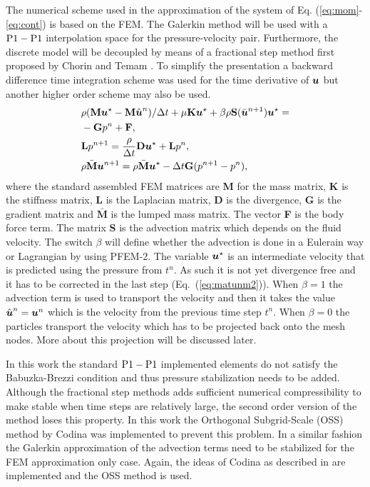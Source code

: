 The numerical scheme used in the approximation of the system of Eq. (\ref{eq:mom}-\ref{eq:cont}) is based on the FEM. The Galerkin method will be used with a $\rm{P1}-\rm{P1}$ interpolation space for the pressure-velocity pair. Furthermore, the discrete model will be decoupled by means of a fractional step method first proposed by Chorin \cite{chorin} and Temam \cite{temam}. To simplify the presentation a backward difference time integration scheme was used for the time derivative of $\boldsymbol{u}$ but another higher order scheme may also be used. 
%
\begin{align}\label{eq:masamat}
&\rho (\textbf{M}\boldsymbol{u}^\star-\textbf{M}\hat{\boldsymbol{u}}^n)/\Delta t+\mu\textbf{K}\boldsymbol{u}^{\star} +\beta\rho\textbf{S}(\bar{\boldsymbol{u}}^{n+1})\boldsymbol{u}^{\star}  = \nonumber\\&-\textbf{G}p^n+ \textbf{F},
\\\label{eq:matpres2}
& \textbf{L}p^{n+1}=\frac{\rho}{\Delta t}\textbf{D}\boldsymbol{u}^\star+ \textbf{L}  p^{n},
\\\label{eq:matunm2}
&\rho \bar{\textbf{M}}\boldsymbol{u}^{n+1}=\rho \bar{\textbf{M}}\boldsymbol{u}^\star-\Delta t\textbf{G}(p^{n+1}- p^n),
\end{align}
%
where the standard assembled FEM matrices are \textbf{M} for the mass matrix, \textbf{K} is the stiffness matrix, \textbf{L} is the Laplacian matrix, \textbf{D} is the divergence, \textbf{G} is the gradient matrix and $\bar{\textbf{M}}$ is the lumped mass matrix. The vector \textbf{F} is the body force term. The matrix \textbf{S} is the advection matrix which depends on the fluid velocity. The switch $\beta$ will define whether the advection is done in a Eulerain way or Lagrangian by using PFEM-2. The variable $\boldsymbol{u}^\star$ is an intermediate velocity that is predicted using the pressure from $t^n$. As such it is not yet divergence free and it has to be corrected in the last step (Eq.~(\ref{eq:matunm2})). When $\beta=1$ the advection term is used to transport the velocity and then it takes the value  $\hat{\boldsymbol{u}}^n=\boldsymbol{u}^n$ which is the velocity from the previous time step $t^n$. When $\beta=0$ the particles transport the velocity which has to be projected back onto the mesh nodes. More about this projection will be discussed later.

In this work the standard $\rm{P1}-\rm{P1}$ implemented elements do not satisfy the Babuzka-Brezzi condition and thus pressure stabilization needs to be added. Although the fractional step methods adds sufficient numerical compressibility to make stable when time steps are relatively large, the second order version of the method loses this property. In this work the Orthogonal Subgrid-Scale (OSS) method by Codina \cite{codina-oss-press} was implemented to prevent this problem. In a similar fashion the Galerkin approximation of the advection terms need to be stabilized for the FEM approximation only case. Again, the ideas of Codina as described in \cite{codina-soto} are implemented and the OSS method is used. 
